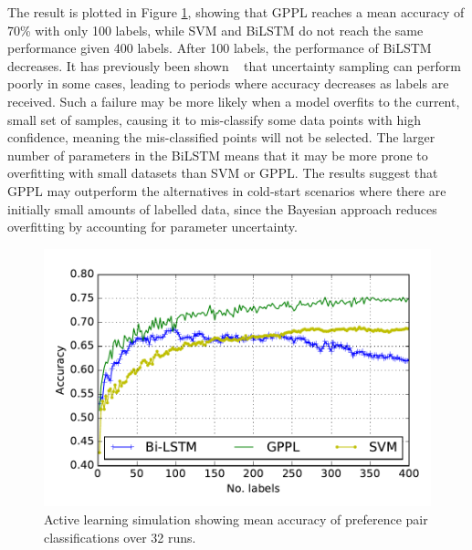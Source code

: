 The result is plotted in Figure \ref{fig:active_learning}, showing that GPPL
reaches a mean accuracy of 70\% with only 100 labels, while SVM and BiLSTM do not reach the same performance given 400 labels. 
After 100 labels, the 
performance of BiLSTM decreases. It has previously been shown ~\cite{cawley2011baseline,guyon2011results,settles2010active} that uncertainty sampling can perform poorly in some cases, leading to periods where accuracy decreases as labels are received.
Such a failure may be more likely when a model overfits to the current, small set of samples, causing it to mis-classify some data points with high confidence, meaning the mis-classified points will not be selected.  
The larger number of parameters in the BiLSTM means that it may be more prone to overfitting with small datasets than SVM or GPPL. 
The results suggest that GPPL may outperform the alternatives in cold-start scenarios where there are initially small amounts of labelled data, since the Bayesian approach reduces overfitting by accounting for parameter uncertainty.
\begin{figure}
\centering
\includegraphics[width=0.9\columnwidth,trim=13 10 14 22,clip=true]{figures/active_learning_2/test_acc}
\caption{Active learning simulation showing mean accuracy of preference pair classifications over 32 runs.}
\label{fig:active_learning}
\end{figure}


